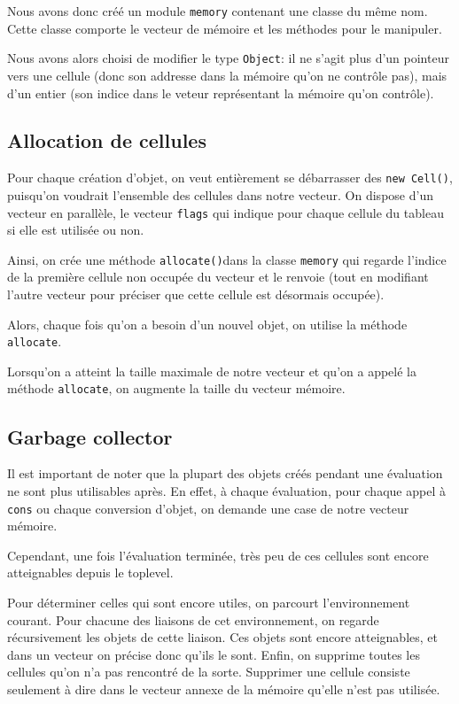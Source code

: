 \documentclass[12pt]{article}
\def\code #1{\lstinline{#1}}
\begin{document}
Nous avons donc créé un module \code{memory} contenant une classe du même nom. Cette classe comporte le vecteur de mémoire et les méthodes pour le manipuler.

Nous avons alors choisi de modifier le type \code{Object}: il ne s'agit plus d'un pointeur vers une cellule (donc son addresse dans la mémoire qu'on ne contrôle pas), mais d'un entier (son indice dans le veteur représentant la mémoire qu'on contrôle).

\subsection{Allocation de cellules}

Pour chaque création d'objet, on veut entièrement se débarrasser des \code{new Cell()}, puisqu'on voudrait l'ensemble des cellules dans notre vecteur.  On dispose  d'un vecteur en parallèle, le vecteur \code{flags} qui indique pour chaque cellule du tableau si elle est utilisée ou non.

Ainsi, on crée une méthode \code{allocate()}dans la classe \code{memory} qui regarde l'indice de la première cellule non occupée du vecteur et le renvoie (tout en modifiant l'autre vecteur pour préciser que cette cellule est désormais occupée).

Alors, chaque fois qu'on a besoin d'un nouvel objet, on utilise la méthode \code{allocate}.

Lorsqu'on a atteint la taille maximale de notre vecteur et qu'on a appelé la méthode \code{allocate}, on augmente la taille du vecteur mémoire.

\subsection{Garbage collector}

Il est important de noter que la plupart des objets créés pendant une évaluation ne sont plus utilisables après. En effet, à chaque évaluation, pour chaque appel à \code{cons} ou chaque conversion d'objet, on demande une case de notre vecteur mémoire.

Cependant, une fois l'évaluation terminée, très peu de ces cellules sont encore atteignables depuis le toplevel.

Pour déterminer celles qui sont encore utiles, on parcourt l'environnement courant. Pour chacune des liaisons de cet environnement, on regarde récursivement les objets de cette liaison. Ces objets sont encore atteignables, et dans un vecteur on précise donc qu'ils le sont. Enfin, on supprime toutes les cellules qu'on n'a pas rencontré de la sorte. Supprimer une cellule consiste seulement à dire dans le vecteur annexe de la mémoire qu'elle n'est pas utilisée.
\end{document}
